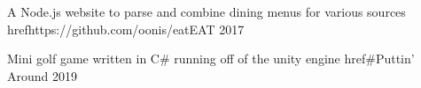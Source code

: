 
\begin{cventries}
  \cventry
    {A Node.js website to parse and combine dining menus for various sources}
    {href{https://github.com/oonis/eat}{EAT}}
    {}
    {2017}
    {
    }

  \cventry
    {Mini golf game written in C# running off of the unity engine}
    {href{#}{Puttin' Around}} %
    {}
    {2019}
    {
    }
\end{cventries}
